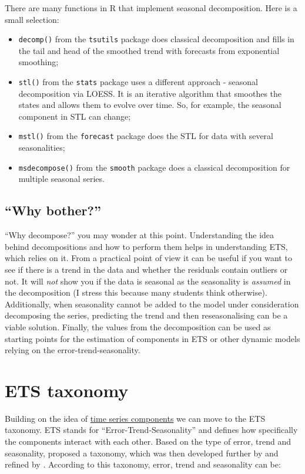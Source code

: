 \documentclass[
]{book}
\providecommand{\tightlist}{%
  \setlength{\itemsep}{0pt}\setlength{\parskip}{0pt}}
\theoremstyle{definition}
\theoremstyle{definition}
\theoremstyle{definition}
\theoremstyle{definition}
\theoremstyle{remark}
\begin{document}
There are many functions in R that implement seasonal decomposition. Here is a small selection:

\begin{itemize}
\tightlist
\item
  \texttt{decomp()} from the \texttt{tsutils} package does classical decomposition and fills in the tail and head of the smoothed trend with forecasts from exponential smoothing;
\item
  \texttt{stl()} from the \texttt{stats} package uses a different approach - seasonal decomposition via LOESS. It is an iterative algorithm that smoothes the states and allows them to evolve over time. So, for example, the seasonal component in STL can change;
\item
  \texttt{mstl()} from the \texttt{forecast} package does the STL for data with several seasonalities;
\item
  \texttt{msdecompose()} from the \texttt{smooth} package does a classical decomposition for multiple seasonal series.
\end{itemize}

\hypertarget{why-bother}{%
\subsection{``Why bother?''}\label{why-bother}}

``Why decompose?'' you may wonder at this point. Understanding the idea behind decompositions and how to perform them helps in understanding ETS, which relies on it. From a practical point of view it can be useful if you want to see if there is a trend in the data and whether the residuals contain outliers or not. It will \emph{not} show you if the data is seasonal as the seasonality is \emph{assumed} in the decomposition (I stress this because many students think otherwise). Additionally, when seasonality cannot be added to the model under consideration decomposing the series, predicting the trend and then reseasonalising can be a viable solution. Finally, the values from the decomposition can be used as starting points for the estimation of components in ETS or other dynamic models relying on the error-trend-seasonality.

\hypertarget{ETSTaxonomy}{%
\section{ETS taxonomy}\label{ETSTaxonomy}}

Building on the idea of \protect\hyperlink{tsComponents}{time series components} we can move to the ETS taxonomy. ETS stands for ``Error-Trend-Seasonality'' and defines how specifically the components interact with each other. Based on the type of error, trend and seasonality, \citep{Pegels1969} proposed a taxonomy, which was then developed further by \citep{Hyndman2002} and refined by \citep{Hyndman2008b}. According to this taxonomy, error, trend and seasonality can be:
\end{document}
